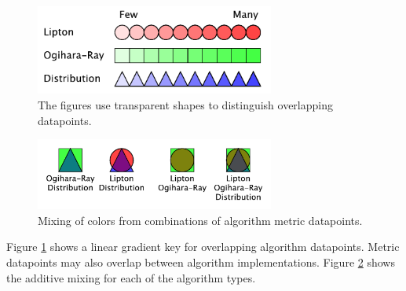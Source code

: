 \begin{figure}[htdp]

\begin{center}

\includegraphics[width=0.7\textwidth]{./figures/gradientKey.pdf}

\caption{The figures use transparent shapes to distinguish overlapping datapoints.}
\label{metricKeyGridient}
\end{center}
\end{figure}
\FloatBarrier

\begin{figure}[htdp]

\begin{center}

\includegraphics[width=0.7\textwidth]{./figures/keyOverlap.pdf}

\caption{Mixing of colors from combinations of algorithm metric datapoints.}
\label{metricKeyOverlap}
\end{center}
\end{figure}
\FloatBarrier


Figure \ref{metricKeyGridient} shows a linear gradient key for overlapping algorithm datapoints.  Metric datapoints may also overlap between algorithm implementations. Figure \ref{metricKeyOverlap} shows the additive mixing for each of the algorithm types.


